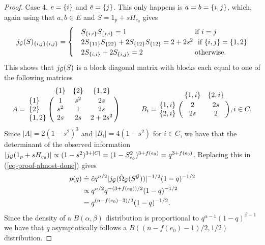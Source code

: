 \begin{proof}
    Case 4. $e = {\left\{i\right\}}$ and $\bar e = {\left\{j\right\}}$. This only happens is $a = b = {\left\{i, j\right\}}$, which, again using that $a, b \in E$ and $S = 1_p + sH_{e_0}$ gives
    \begin{equation*}
        j_\G(S)_{\eset{i, j} \eset{i, j}} = \begin{cases}
            &S_\eset{i, i}S_\eset{i, i} = 1\ \ \ \ \ \ \ \ \ \ \ \ \ \ \ \ \ \ \ \ \ \ \ \ \ \ \ \  \t{ if } i = j\\
            &2S_\eset{1 1}S_\eset{2 2} + 2S_\eset{1 2}S_\eset{1 2} = 2 + 2s^2\  \t{ if } \eset{i, j} = \eset{1, 2}\\
            &2S_\eset{i,i} + 2S_\eset{i, j} = 2\ \ \ \ \ \ \ \ \ \ \ \ \ \ \ \ \ \ \ \ \  \t{ otherwise.}
        \end{cases}
    \end{equation*}
    This shows that $j_{\mathcal{G}}(S)$ is a block diagonal matrix with blocks each equal to one of the following matrices
    \begin{equation*}
        A = \bordermatrix{~ & \eset{1} & \eset{2} & \eset{1, 2} \cr
            \eset{1} & 1 & s^2 & 2s \cr
            \eset{2} & s^2 & 1 & 2s \cr
            \eset{1, 2} & 2s & 2s & 2 + 2s^2 \cr
        }
        \ \ \ \ \ \ \ \ \ 
        B_i = \bordermatrix{~ & \eset{1, i} & \eset{2, i} \cr
            \eset{1, i} & 2 & 2s \cr
            \eset{2, i} & 2s & 2 \cr
        }, i \in C.
    \end{equation*}
    Since $|A| = 2 (1-s^2)^3$ and $|B_i| = 4(1-s^2)$ for $i \in C$, we have that the determinant of the observed information $\left|j_{\mathcal{G}}(1_p + sH_{e_0})\right| \propto (1-s^2)^{3 + |C|} = (1 - S_{e_0}^2)^{3 + f(e_0)} = q^{3 + f(e_0)}$. Replacing this in (\ref{eq-proof-almost-done}) gives
    \begin{align*}
        p(q) 
        &\doteq \hat c q^{n/2} |j_{{\mathcal{G}}}(\hat\Omega_{{\mathcal{G}}}(S^{{\mathcal{G}}})) |^{-1/2} (1 - q)^{-1/2}\\
        &\propto q^{n/2} q^{-(3 + f(e_0))/2} (1 - q)^{-1/2} \\
        &= q^{(n - f(e_0) - 3)/2}(1-q)^{-1/2}.
    \end{align*}
    Since the density of a $B(\alpha, \beta)$ distribution is proportional to $q^{\alpha-1}(1-q)^{\beta-1}$ we have that $q$ asymptotically follows a $B((n - f(e_0) - 1)/2, 1/2)$ distribution.
\end{proof}

